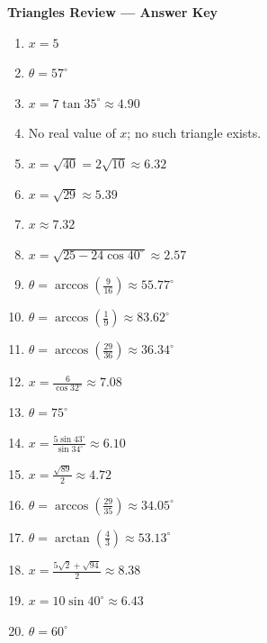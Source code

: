 \documentclass[11pt,a4paper]{article}
\begin{document}
\begin{center}
    {\LARGE \textbf{Triangles Review --- Answer Key}}\\[4pt]
\end{center}

\begin{enumerate}

\item \(x=5\)

\item \(\theta=57^\circ\)

\item \(x=7\tan 35^\circ\approx 4.90\)

\item No real value of \(x\); no such triangle exists.

\item \(x=\sqrt{40}=2\sqrt{10}\approx 6.32\)

\item \(x=\sqrt{29}\approx 5.39\)

\item \(x\approx 7.32\)

\item \(x=\sqrt{25-24\cos 40^\circ}\approx 2.57\)

\item \(\theta=\arccos\left(\frac{9}{16}\right)\approx 55.77^\circ\)

\item \(\theta=\arccos\left(\frac{1}{9}\right)\approx 83.62^\circ\)

\item \(\theta=\arccos\left(\frac{29}{36}\right)\approx 36.34^\circ\)

\item \(x=\frac{6}{\cos 32^\circ}\approx 7.08\)

\item \(\theta=75^\circ\)

\item \(x=\frac{5\sin 43^\circ}{\sin 34^\circ}\approx 6.10\)

\item \(x=\frac{\sqrt{89}}{2}\approx 4.72\)

\item \(\theta=\arccos\left(\frac{29}{35}\right)\approx 34.05^\circ\)

\item \(\theta=\arctan\left(\frac{4}{3}\right)\approx 53.13^\circ\)

\item \(x=\frac{5\sqrt2+\sqrt{94}}{2}\approx 8.38\)

\item \(x=10\sin 40^\circ\approx 6.43\)

\item \(\theta=60^\circ\)

\end{enumerate}
\end{document}
